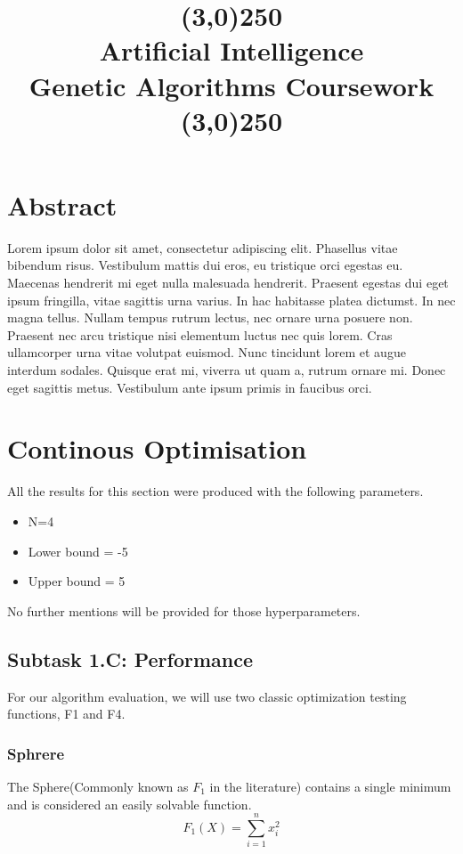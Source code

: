 \documentclass[openany]{article}
\title{\line(3,0){250}\\Artificial Intelligence \\ Genetic Algorithms Coursework  \\\line(3,0){250}}
\begin{document}
	\maketitle
	\pagebreak
	\section{Abstract}
		Lorem ipsum dolor sit amet, consectetur adipiscing elit. Phasellus vitae bibendum risus. Vestibulum mattis dui eros, 
		eu tristique orci egestas eu. Maecenas hendrerit mi eget nulla malesuada hendrerit. Praesent egestas dui eget ipsum fringilla, 
		vitae sagittis urna varius. In hac habitasse platea dictumst. In nec magna tellus. Nullam tempus rutrum lectus, nec ornare urna 
		posuere non. Praesent nec arcu tristique nisi elementum luctus nec quis lorem. Cras ullamcorper urna vitae volutpat euismod. Nunc 
		tincidunt lorem et augue interdum sodales. Quisque erat mi, viverra ut quam a, rutrum ornare mi. Donec eget sagittis metus. 
		Vestibulum ante ipsum primis in faucibus orci. 
	\pagebreak
	\section{Continous Optimisation}
		\begin{note}
			All the results for this section were produced with the following parameters.
			\begin{itemize}
				\item N=4
				\item Lower bound = -5
				\item Upper bound = 5
			\end{itemize}
			No further mentions will be provided for those hyperparameters.
		\end{note}
		\subsection{Subtask 1.C: Performance}
			For our algorithm evaluation, we will use two classic optimization testing functions, F1 and F4.
			\subsubsection{Sphrere}
				The Sphere(Commonly known as $F_{1}$ in the literature\cite{performance}) contains a single minimum and is considered an easily solvable function.
				\begin{equation}
				F_1(X)=\sum_{i=1}^{n}{x_{i}^2}
				\end{equation}
\end{document}
